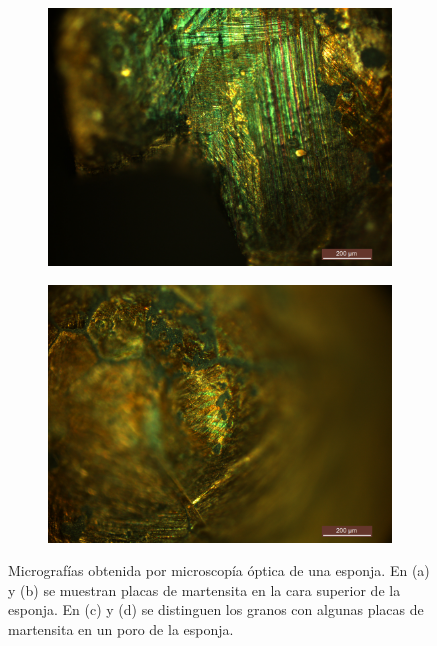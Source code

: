 \documentclass[a4paper,12pt,fleqn,twoside,openany]{book}
\begin{document}
\begin{figure}[h]
\begin{subfigure}{0.45\textwidth}
        \includegraphics[width=\textwidth]{Img/Introduccion/EspAMicro2.jpg}
        \caption{}
        \label{fig:EspAMicro2}
    \end{subfigure}
     \begin{subfigure}{0.45\textwidth}
        \includegraphics[width=\textwidth]{Img/Introduccion/EspAMicro3.jpg}
        \caption{}
        \label{fig:EspAMicro3}
    \end{subfigure}
 \caption{Micrografías obtenida por microscopía óptica de una esponja. En (a) y (b) se muestran placas de martensita en la cara superior de la esponja. En (c) y (d) se distinguen los granos con algunas placas de martensita en un poro de la esponja.}
  \label{fig:MicrografiasEsponja}
  \end{figure}
\end{document}
